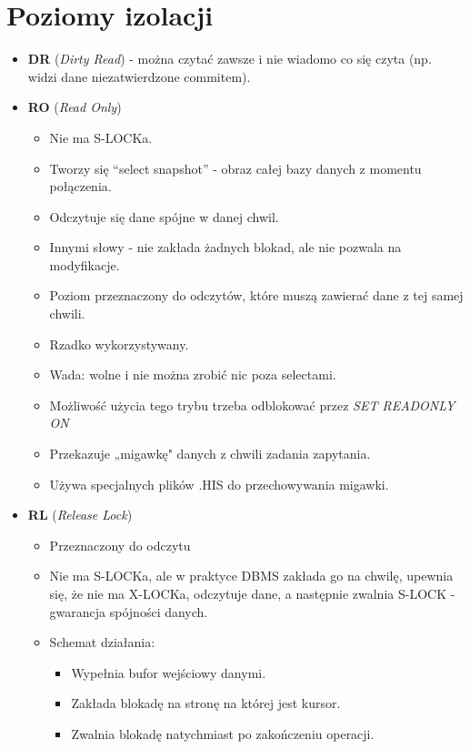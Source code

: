 \documentclass[a4paper,twoside]{article}
\begin{document}
  	\section*{Poziomy izolacji}
  	\begin{itemize}
  		\item \textbf{DR} (\emph{Dirty Read}) - można czytać zawsze i nie wiadomo co się czyta (np. widzi dane niezatwierdzone commitem).
  		\item \textbf{RO} (\emph{Read Only})
  		\begin{itemize}
  			\item Nie ma S-LOCKa.
  			\item Tworzy się “select snapshot” - obraz całej bazy danych z momentu połączenia.
  			\item Odczytuje się dane spójne w danej chwil.
  			\item Innymi słowy - nie zakłada żadnych blokad, ale nie pozwala na modyfikacje.
  			\item Poziom przeznaczony do odczytów, które muszą zawierać dane z tej samej chwili.
  			\item Rzadko wykorzystywany.
  			\item Wada: wolne i nie można zrobić nic poza selectami.
  			\item Możliwość użycia tego trybu trzeba odblokować przez \emph{SET READONLY ON}
  			\item Przekazuje „migawkę" danych z chwili zadania zapytania.
  			\item Używa specjalnych plików .HIS do przechowywania migawki.
  		\end{itemize}
  		\item \textbf{RL} (\emph{Release Lock})
  		\begin{itemize}
  			\item Przeznaczony do odczytu
  			\item Nie ma S-LOCKa, ale w praktyce DBMS zakłada go na chwilę, upewnia się, że nie ma X-LOCKa, odczytuje dane, a następnie zwalnia S-LOCK - gwarancja spójności danych.
  			\item Schemat działania:
  			\begin{itemize}
  				\item Wypełnia bufor wejściowy danymi.
  				\item Zakłada blokadę na stronę na której jest kursor.
  				\item Zwalnia blokadę natychmiast po zakończeniu operacji.
  			\end{itemize}

\end{itemize}
\end{itemize}
\end{document}
